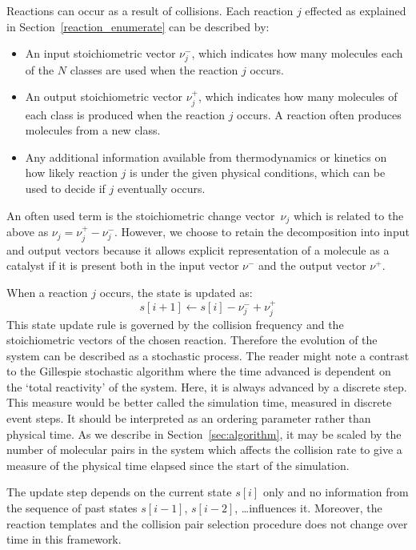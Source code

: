 Reactions can occur as a result of collisions. Each reaction $j$ effected as explained in Section~\ref{reaction_enumerate} can be described by:
\begin{itemize}
    \item An input stoichiometric vector $\nu_j^-$, which indicates how many molecules each of the $N$ classes are used when the reaction $j$ occurs.
    \item An output stoichiometric vector $\nu_j^+$, which indicates how many molecules of each class is produced when the reaction $j$ occurs. A reaction often produces molecules from a new class.
    \item Any additional information available from thermodynamics or kinetics on how likely reaction $j$ is under the given physical conditions, which can be used to decide if $j$ eventually occurs.
\end{itemize}
An often used term is the stoichiometric change vector~$\nu_j$ which is related to the above as $\nu_j = \nu_j^+ - \nu_j^-$. However, we choose to retain the decomposition into input and output vectors because it allows explicit representation of a molecule as a catalyst if it is present both in the input vector $\nu^-$ and the output vector $\nu^+$.

When a reaction $j$ occurs, the state is updated as:
\begin{equation*}
    s[i+1] \leftarrow s[i] - \nu_j^- + \nu_j^+ 
\end{equation*}
This state update rule is governed by the collision frequency and the stoichiometric vectors of the chosen reaction. Therefore the evolution of the system can be described as a stochastic process. The reader might note a contrast to the Gillespie stochastic algorithm where the time advanced is dependent on the `total reactivity' of the system. Here, it is always advanced by a discrete step. This measure would be better called the simulation time, measured in discrete event steps. It should be interpreted as an ordering parameter rather than physical time. As we describe in Section~\ref{sec:algorithm}, it may be scaled by the number of molecular pairs in the system which affects the collision rate to give a measure of the physical time elapsed since the start of the simulation.

The update step depends on the current state $s[i]$ only and no information from the sequence of past states $s[i-1]$, $s[i-2]$, \ldots influences it. Moreover, the reaction templates and the collision pair selection procedure does not change over time in this framework.

